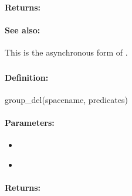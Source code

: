 \paragraph{Returns:}


\paragraph{See also:}  This is the asynchronous form of .

\pagebreak
\subsubsection{}
\label{api:ruby:group_del}


\paragraph{Definition:}
\begin{rubycode}
group_del(spacename, predicates)
\end{rubycode}

\paragraph{Parameters:}
\begin{itemize}[noitemsep]
\item {}\\

\item {}\\

\end{itemize}

\paragraph{Returns:}


\pagebreak
\subsubsection{}
\label{api:ruby:async_group_del}


